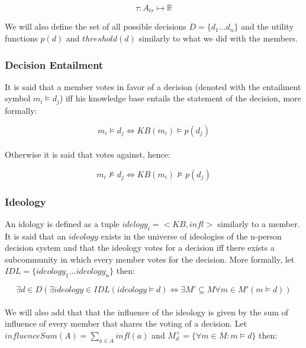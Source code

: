$$\tau \colon A_{tr} \mapsto \mathbb{R}$$

We will also define the set of all possible decisions $D = \{d_{1} \ldots d_{n} \}$ and the utility functions $p(d)$ and $threshold(d)$ similarly to what we did with the members.

\subsubsection{Decision Entailment} 

It is said that a member votes in favor of a decision (denoted with the entailment symbol $m_{i} \models d_{j}$) iff his knowledge base entails the statement of the decision, more formally:

$$m_{i} \models d_{j} \iff KB(m_{i}) \models p(d_{j})$$

\paragraph{}

Otherwise it is said that votes against, hence:

$$m_{i} \not\models d_{j} \iff KB(m_{i}) \not\models p(d_{j})$$

\subsubsection{Ideology} 

An idology is defined as a tuple $idelogy_{i}=<KB, infl>$ similarly to a member. It is said that an $ideology$ exists in the universe of ideologies of the n-person decision system and that the ideology votes for a decision iff there exists a subcommunity in which every member votes for the decision. More formally, let $IDL = \{ideology_{1} \ldots ideology_{n}\}$ then:

$$\exists d \in D (\exists ideology \in IDL (ideology \models d) \iff \exists M' \subseteq M \forall m \in M' (m \models d))$$

\paragraph{}

We will also add that that the influence of the ideology is given by the sum of influence of every member that shares the voting of a decision. Let $influenceSum(A) = \sum\limits_{a \in A} infl(a)$ and $M_{d}^{+} = \{\forall m \in M \colon m \models d\}$ then:

